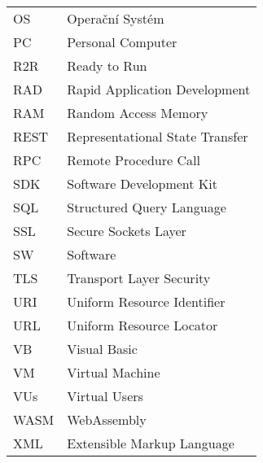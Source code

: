 \begin{tabular}{ll}
OS & Operační Systém \\
PC & Personal Computer \\
R2R & Ready to Run \\
RAD & Rapid Application Development \\
RAM & Random Access Memory \\
REST & Representational State Transfer \\
RPC & Remote Procedure Call \\
SDK & Software Development Kit \\
SQL & Structured Query Language \\
SSL & Secure Sockets Layer \\
SW & Software \\
TLS & Transport Layer Security \\
URI & Uniform Resource Identifier \\
URL & Uniform Resource Locator \\
VB & Visual Basic \\
VM & Virtual Machine \\
VUs & Virtual Users \\
WASM & WebAssembly \\
XML & Extensible Markup Language \\
\end{tabular}

